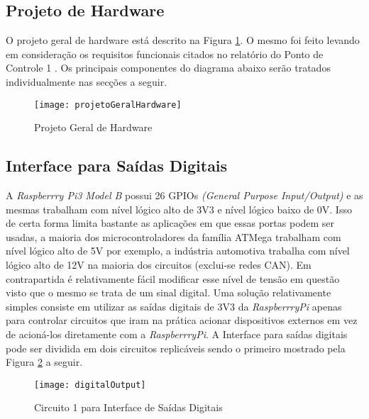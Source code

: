 \subsection{Projeto de Hardware}

O projeto geral de hardware está descrito na Figura \ref{fig-projetoGeralHardware}. O mesmo foi feito levando em consideração os requisitos funcionais citados no relatório do Ponto de Controle 1 \cite{relPC1}.  Os principais componentes do diagrama abaixo serão tratados individualmente nas secções a seguir.

\begin{figure}[htbp]
	\centering
		\texttt{[image: projetoGeralHardware]}
	\caption{Projeto Geral de Hardware}
	\label{fig-projetoGeralHardware}
\end{figure}


\subsection{Interface para Saídas Digitais}
	A \textit{Raspberrry Pi3 Model B} possui 26 GPIOs \textit{(General Purpose Input/Output)} e as mesmas trabalham com nível lógico alto de 3V3 e nível lógico baixo de 0V. Isso de certa forma limita bastante as aplicações em que essas portas podem ser usadas, a maioria dos microcontroladores da família ATMega trabalham com nível lógico alto de 5V por exemplo, a indústria automotiva trabalha com nível lógico alto de 12V na maioria dos circuitos (exclui-se redes CAN). Em contrapartida é relativamente fácil modificar esse nível de tensão em questão visto que o mesmo se trata de um sinal digital. Uma solução relativamente simples consiste em utilizar as saídas digitais de 3V3 da \textit{RaspberrryPi} apenas para controlar circuitos que iram na prática acionar dispositivos externos em vez de acioná-los diretamente com a \textit{RaspberrryPi}. A Interface para saídas digitais pode ser dividida em dois circuitos replicáveis sendo o primeiro mostrado pela Figura \ref{fig-digitalOutput} a seguir.
	
	\begin{figure}[htbp]
		\centering
			\texttt{[image: digitalOutput]}
		\caption{Circuito 1 para Interface de Saídas Digitais}
		\label{fig-digitalOutput}
	\end{figure}

